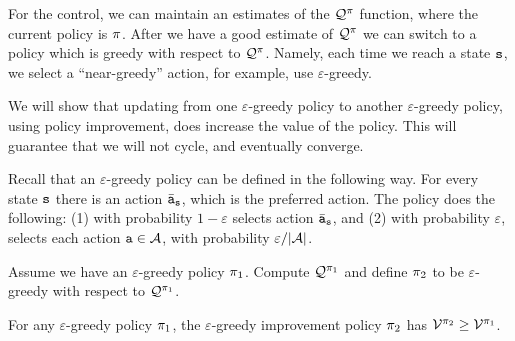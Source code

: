 For the control, we can maintain an estimates of the $\mathcal{Q}^\pi$
function, where the current policy is $\pi$. After we have a
good estimate of $\mathcal{Q}^\pi$ we can switch to a policy which is
greedy with respect to $\mathcal{Q}^\pi$. Namely, each time we reach a
state ${\tt s}$, we select a ``near-greedy'' action, for example, use
$\varepsilon$-greedy.

We will show that updating from one $\varepsilon$-greedy policy to
another $\varepsilon$-greedy policy, using policy improvement, does
increase the value of the policy. This will guarantee that we will not cycle, and eventually converge.

Recall that an $\varepsilon$-greedy policy can be defined in the
following way. For every state ${\tt s}$ there is an action
$\bar{{\tt a}}_{\tt s}$, which is the preferred action. The policy
does the following: (1) with probability $1-\varepsilon$ selects action $\bar{{\tt a}}_{\tt s}$, and (2) with probability $\varepsilon$, selects
each action ${\tt a} \in \mathcal{A}$, with probability
$\varepsilon/|\mathcal{A}|$.

Assume we have an $\varepsilon$-greedy policy $\pi_1$. Compute
$\mathcal{Q}^{\pi_1}$ and define $\pi_2$ to be $\varepsilon$-greedy
with respect to $\mathcal{Q}^{\pi_1}$.

\begin{theorem}
For any $\varepsilon$-greedy policy $\pi_1$, the
$\varepsilon$-greedy improvement policy $\pi_2$ has
$\mathcal{V}^{\pi_2}\geq \mathcal{V}^{\pi_1}$.
\end{theorem}

